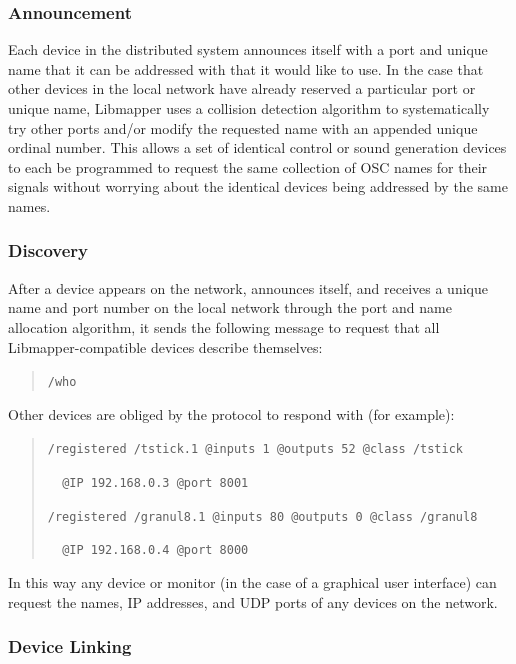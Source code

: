 \subsubsection{Announcement}

Each device in the distributed system announces itself with a port and unique name that it can be addressed with that it would like to use. In the case that other devices in the local network have already reserved a particular port or unique name, Libmapper uses a collision detection algorithm to systematically try other ports and/or modify the requested name with an appended unique ordinal number. This allows a set of identical control or sound generation devices to each be programmed to request the same collection of OSC names for their signals without worrying about the identical devices being addressed by the same names.

\subsubsection{Discovery}

After a device appears on the network, announces itself, and receives a unique name and port number on the local network through the port and name allocation algorithm, it sends the following message to request that all Libmapper-compatible devices describe themselves:

\begin{quote}
\verb#/who#
\end{quote}

Other devices are obliged by the protocol to respond with (for example):

\begin{quote}
\verb#/registered /tstick.1 @inputs 1 @outputs 52 @class /tstick# 

\verb#  @IP 192.168.0.3 @port 8001#

\verb#/registered /granul8.1 @inputs 80 @outputs 0 @class /granul8#

\verb#  @IP 192.168.0.4 @port 8000#
\end{quote}

In this way any device or monitor (in the case of a graphical user interface) can request the names, IP addresses, and UDP ports of any devices on the network. 

\subsubsection{Device Linking}

